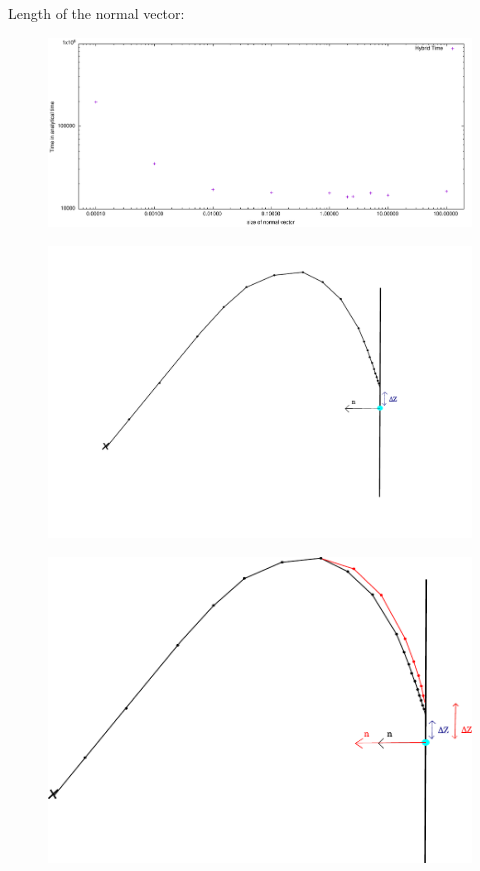 \documentclass{beamer}
\begin{document}
\begin{frame}
	Length of the normal vector:
	\begin{figure}
		\includegraphics[width=\textwidth]{figures/NormVsRealTime.pdf}
	\end{figure}
\end{frame}
\begin{frame}
	\begin{figure}
		\includegraphics[width=\textwidth]{figures/PrincipleNormIllu.pdf}
	\end{figure}
\end{frame}
\begin{frame}
	\begin{figure}
		\includegraphics[width=\textwidth]{figures/PrincipleNormIllu2.pdf}
	\end{figure}
\end{frame}
\end{document}
